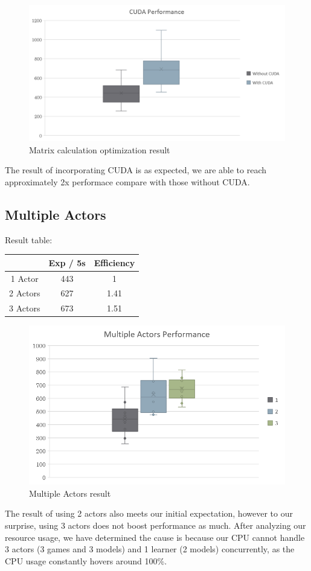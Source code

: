 \documentclass[sigconf]{acmart}
\begin{document}
\begin{figure}[H]
  \centering
  \includegraphics[width=\columnwidth]{cuda_r.png}
  \caption{Matrix calculation optimization result}
\end{figure}
The result of incorporating CUDA is as expected, we are able to reach approximately 2x performace compare with those without CUDA. 


\subsection{Multiple Actors}
Result table:
\begin{center}
  \begin{tabular}{ |c|c|c| } 
   \hline
    & Exp / 5s & Efficiency \\ 
   \hline
   1 Actor & 443 & 1 \\ 
   \hline
   2 Actors & 627 & 1.41 \\ 
   \hline
   3 Actors & 673 & 1.51 \\ 
   \hline
  \end{tabular}
\end{center}
\begin{figure}[h]
  \centering
  \includegraphics[width=\columnwidth]{actor_r.png}
  \caption{Multiple Actors result}
\end{figure}
The result of using 2 actors also meets our initial expectation, however to our surprise, using 3 actors does not boost performance as much. After analyzing our resource usage, we have determined the cause is because our CPU cannot handle 3 actors (3 games and 3 models) and 1 learner (2 models) concurrently, as the CPU usage constantly hovers around 100\%.
\end{document}
